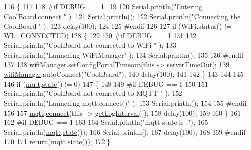 \begin{DoxyCode}
116 \{
117 
118 \textcolor{preprocessor}{#if DEBUG == 1  }
119 
120     Serial.println(\textcolor{stringliteral}{"Entering CoolBoard.connect "} );
121     Serial.println();
122     Serial.println(\textcolor{stringliteral}{"Connecting the CoolBoard  "} );
123     delay(100);
124 
125 \textcolor{preprocessor}{#endif}
126 
127     \textcolor{keywordflow}{if} (WiFi.status() != WL\_CONNECTED)
128     \{       
129     
130 \textcolor{preprocessor}{    #if DEBUG == 1      }
131 
132         Serial.println(\textcolor{stringliteral}{"CoolBoard not connected to WiFi "} );
133         Serial.println(\textcolor{stringliteral}{"Launching WiFiManager"} );
134         Serial.println();
135 
136 \textcolor{preprocessor}{    #endif}
137     
138         \hyperlink{classCoolBoard_a55b28656e295140928557c47d7fff01e}{wifiManager}.setConfigPortalTimeout(\textcolor{keyword}{this} -> \hyperlink{classCoolBoard_a7a8d8d3d316220cdd049cd63c1aa8fe6}{serverTimeOut});
139         \hyperlink{classCoolBoard_a55b28656e295140928557c47d7fff01e}{wifiManager}.autoConnect(\textcolor{stringliteral}{"CoolBoard"});
140         delay(100);
141 
142     \}
143 
144 
145     
146     \textcolor{keywordflow}{if} (\hyperlink{classCoolBoard_a2399f44d7c23c1149a335cb3b46d90f1}{mqtt}.\hyperlink{classCoolMQTT_a5d003307eff78efbd585e42b43b72b6d}{state}() != 0)
147     \{   
148     
149 \textcolor{preprocessor}{    #if DEBUG == 1  }
150     
151         Serial.println(\textcolor{stringliteral}{"CoolBoard not connected to MQTT "} );
152         Serial.println(\textcolor{stringliteral}{"Launching mqtt.connect()"} );
153         Serial.println();
154 
155 \textcolor{preprocessor}{    #endif  }
156     
157         \hyperlink{classCoolBoard_a2399f44d7c23c1149a335cb3b46d90f1}{mqtt}.\hyperlink{classCoolMQTT_a58b0b1f64b269c2681685208262fba1d}{connect}(\textcolor{keyword}{this} -> \hyperlink{classCoolBoard_aaa24480b273fc095a1356a589c333781}{getLogInterval}());
158         delay(100);
159         
160     \}
161     
162 \textcolor{preprocessor}{#if DEBUG == 1}
163 
164     Serial.println(\textcolor{stringliteral}{"mqtt state is :"});
165     Serial.println(\hyperlink{classCoolBoard_a2399f44d7c23c1149a335cb3b46d90f1}{mqtt}.\hyperlink{classCoolMQTT_a5d003307eff78efbd585e42b43b72b6d}{state}());
166     Serial.println();
167     delay(100);
168 
169 \textcolor{preprocessor}{#endif}
170 
171     \textcolor{keywordflow}{return}(\hyperlink{classCoolBoard_a2399f44d7c23c1149a335cb3b46d90f1}{mqtt}.\hyperlink{classCoolMQTT_a5d003307eff78efbd585e42b43b72b6d}{state}());
172 \}
\end{DoxyCode}
